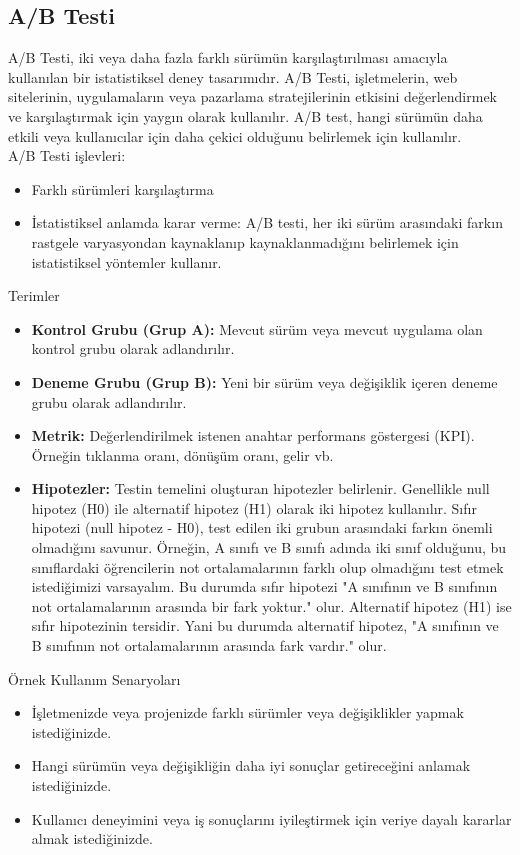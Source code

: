 \subsection{A/B Testi}
A/B Testi, iki veya daha fazla farklı sürümün karşılaştırılması amacıyla kullanılan bir istatistiksel deney tasarımıdır. A/B Testi, işletmelerin, web sitelerinin, uygulamaların veya pazarlama stratejilerinin etkisini değerlendirmek ve karşılaştırmak için yaygın olarak kullanılır. A/B test, hangi sürümün daha etkili veya kullanıcılar için daha çekici olduğunu belirlemek için kullanılır.\\
A/B Testi işlevleri:
\begin{itemize}
    \item Farklı sürümleri karşılaştırma
    \item İstatistiksel anlamda karar verme: A/B testi, her iki sürüm arasındaki farkın rastgele varyasyondan kaynaklanıp kaynaklanmadığını belirlemek için istatistiksel yöntemler kullanır.
\end{itemize}

Terimler
\begin{itemize}
    \item \textbf{Kontrol Grubu (Grup A):} Mevcut sürüm veya mevcut uygulama olan kontrol grubu olarak adlandırılır.
    \item \textbf{Deneme Grubu (Grup B):} Yeni bir sürüm veya değişiklik içeren deneme grubu olarak adlandırılır.
    \item \textbf{Metrik:} Değerlendirilmek istenen anahtar performans göstergesi (KPI). Örneğin tıklanma oranı, dönüşüm oranı, gelir vb.
    \item \textbf{Hipotezler:} Testin temelini oluşturan hipotezler belirlenir. Genellikle null hipotez (H0) ile alternatif hipotez (H1) olarak iki hipotez kullanılır. Sıfır hipotezi (null hipotez - H0), test edilen iki grubun arasındaki farkın önemli olmadığını savunur. Örneğin, A sınıfı ve B sınıfı adında iki sınıf olduğunu, bu sınıflardaki öğrencilerin not ortalamalarının farklı olup olmadığını test etmek istediğimizi varsayalım. Bu durumda sıfır hipotezi "A sınıfının ve B sınıfının not ortalamalarının arasında bir fark yoktur." olur. Alternatif hipotez (H1) ise sıfır hipotezinin tersidir. Yani bu durumda alternatif hipotez, "A sınıfının ve B sınıfının not ortalamalarının arasında fark vardır." olur.
\end{itemize}

Örnek Kullanım Senaryoları
\begin{itemize}
    \item İşletmenizde veya projenizde farklı sürümler veya değişiklikler yapmak istediğinizde.
    \item Hangi sürümün veya değişikliğin daha iyi sonuçlar getireceğini anlamak istediğinizde.
    \item Kullanıcı deneyimini veya iş sonuçlarını iyileştirmek için veriye dayalı kararlar almak istediğinizde.
\end{itemize}

